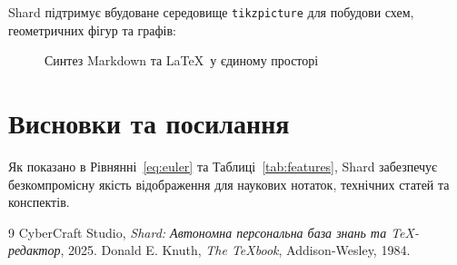 \documentclass[11pt, a4paper]{article}
\begin{document}
Shard підтримує вбудоване середовище \texttt{tikzpicture} для побудови схем, геометричних фігур та графів:

\begin{figure}[h]
\centering
{}
\caption{Синтез Markdown та \LaTeX\ у єдиному просторі}
\label{fig:diagram}
\end{figure}

\section{Висновки та посилання}
Як показано в Рівнянні~\eqref{eq:euler} та Таблиці~\ref{tab:features}, Shard забезпечує безкомпромісну якість відображення для наукових нотаток, технічних статей та конспектів.

\begin{thebibliography}{9}
CyberCraft Studio, \textit{Shard: Автономна персональна база знань та \TeX-редактор}, 2025.
Donald E. Knuth, \textit{The \TeX book}, Addison-Wesley, 1984.
\end{thebibliography}
\end{document}
